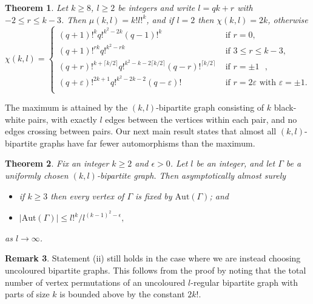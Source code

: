 \documentclass{daj}
\newcommand\Aut{\mathrm{Aut}}
\theoremstyle{plain}
\newtheorem{theorem}{Theorem}[section]
\theoremstyle{definition}
\newtheorem{remark}[theorem]{Remark}
\begin{document}
\begin{theorem}\label{mainmin}
Let $k\geq 8$, $l\geq2$ be integers and write $l=qk+r$ with $-2\leq r\leq k-3$. Then $\mu(k,l)=k!l!^k$, and if $l=2$ then $\chi(k,l)=2k$, otherwise
$$\chi(k,l)=\begin{cases}
(q+1)!^kq!^{k^2-2k}(q-1)!^k&\text{ if $r=0$},\\
(q+1)!^{rk}q!^{k^2-rk}&\text{ if $3\leq r\leq k-3$},\\
(q+r)!^{k+\lceil k/2\rceil }q!^{k^2-k-2\lceil k/2\rceil}(q-r)!^{\lceil k/2\rceil}&\text{ if $r=\pm1$ },\\
(q+\varepsilon)!^{2k+1}q!^{k^2-2k-2}(q-\varepsilon)!&\text{ if $r=2\varepsilon$ with $\varepsilon=\pm1$}.\\
\end{cases}$$
\end{theorem} 
The maximum is attained by the $(k,l)$-bipartite graph consisting of $k$ black-white pairs, with exactly $l$ edges between the vertices within each pair, and no edges crossing between pairs. Our next main result states that almost all $(k,l)$-bipartite graphs have far fewer automorphisms than the maximum.
\begin{theorem}\label{mainrand}
Fix an integer $k\geq 2$ and $\epsilon>0$. Let $l$ be an integer, and let $\Gamma$ be a uniformly chosen $(k,l)$-bipartite graph. Then asymptotically almost surely \begin{itemize}\item[(i)] if $k\geq 3$ then every vertex of $\Gamma$ is fixed by $\Aut(\Gamma)$; and 
\item[(ii)] $|\Aut(\Gamma)|\leq l!^k/l^{{(k-1)}^2-\epsilon},$
\end{itemize}
as $l\to \infty$.
\end{theorem}
\begin{remark}
Statement (ii) still holds in the case where we are instead choosing uncoloured bipartite graphs. This follows from the proof by noting that the total number of vertex permutations of an uncoloured $l$-regular bipartite graph with parts of size $k$ is bounded above by the constant $2k!$.
\end{remark}
\end{document}
